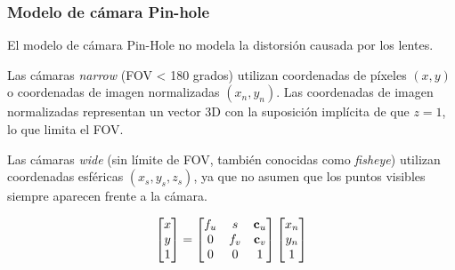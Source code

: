 \begin{frame}
    \frametitle{Modelo de cámara Pin-hole}
    
    El modelo de cámara Pin-Hole no modela la distorsión causada por los lentes.

    Las cámaras \emph{narrow} (FOV < 180 grados) utilizan coordenadas de píxeles $(x, y)$ o coordenadas de imagen normalizadas $(x_{n}, y_{n})$. 
    Las coordenadas de imagen normalizadas representan un vector 3D con la suposición implícita de que $z = 1$, lo que limita el FOV.

    Las cámaras \emph{wide} (sin límite de FOV, también conocidas como \emph{fisheye}) utilizan coordenadas esféricas $(x_{s}, y_{s}, z_{s})$, ya que no asumen que los puntos visibles siempre aparecen frente a la cámara.

    \begin{equation*}
        \begin{bmatrix}
            x\\
            y\\
            1
        \end{bmatrix} =
        \begin{bmatrix}
            f_{u} & s & \boldsymbol{\mathbf{c}}_{u}\\
            0 & f_{v} & \boldsymbol{\mathbf{c}}_{v}\\
            0 & 0 & 1
        \end{bmatrix}
        \begin{bmatrix}
            x_{n}\\
            y_{n}\\
            1
        \end{bmatrix}
    \end{equation*}
    
\end{frame}



